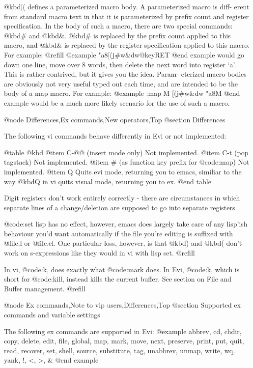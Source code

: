 {{{{{{@kbd{[(} defines a parameterized macro body.  A parameterized macro is diff-
erent from standard macro text in that it is parameterized by prefix
count and register specification.  In the body of such a macro, there
are two special commands: @kbd{#} and @kbd{&}.
@kbd{#} is replaced by the prefix
count applied to this macro, and @kbd{&} is replaced by the register
specification applied to this macro.  For example: @refill
@example
"a8[(j#w&dw@key{RET}
@end example
would go down one line, move over 8 words, then delete the next word
into register `a'.  This is rather contrived, but it gives you the idea.
Param- eterized macro bodies are obviously not very useful typed out
each time, and are intended to be the body of a map macro.  For example:
@example
:map M [(j#w&dw
"a8M
@end example
would be a much more likely scenario for the use of such a macro.

@node Differences,Ex commands,New operators,Top
@section Differences

The following vi commands behave differently in Evi or not implemented:

@table @kbd
@item C-@@
(insert mode only) Not implemented.
@item C-t
(pop tagstack) Not implemented.
@item #
(as function key prefix for @code{:map}) Not implemented.
@item Q
Quits evi mode, returning you to emacs, similiar to the way @kbd{Q}
in vi quits visual mode, returning you to ex.
@end table

Digit registers don't work entirely correctly - there are circumstances
in which separate lines of a change/deletion are supposed to go into
separate registers

@code{:set lisp} has no effect, however, emacs does largely take care of
any lisp'ish behaviour you'd want automatically if the file you're
editing is suffixed with @file{.l} or @file{.el}.
One particular loss, however,
is that @kbd{)} and @kbd{(} don't work on s-expressions
like they would in vi with lisp set. @refill

In vi, @code{:k}, does exactly what @code{:mark} does.  In Evi, @code{:k},
which is short for @code{:kill}, instead kills the current buffer.  See
section on File and Buffer management. @refill

@node Ex commands,Note to vip users,Differences,Top
@section Supported ex commands and variable settings

The following ex commands are supported in Evi:
@example
abbrev, cd, chdir, copy, delete, edit, file, global, map, mark, move, next,
preserve, print, put, quit, read, recover, set, shell, source, substitute,
tag, unabbrev, unmap, write, wq, yank, !, <, >, &
@end example

}}}}}}

